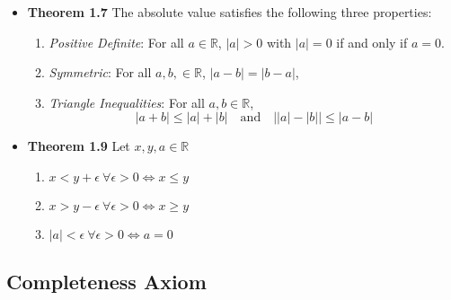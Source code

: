 \documentclass[11pt,a4paper]{article}
\begin{document}
\begin{itemize}
    \item \textbf{Theorem 1.7} The absolute value satisfies the following three properties:
        \begin{enumerate}
            \item \emph{Positive Definite}:
                For all $a \in \mathbb{R}$, $|a| > 0$ with $|a| = 0$ if and only if $a = 0$.
            \item \emph{Symmetric}:
                For all $a, b, \in \mathbb{R}$, $|a - b| = |b - a|$,
            \item \emph{Triangle Inequalities}:
                For all $a, b \in \mathbb{R}$,
                \[
                    |a + b| \leq |a| + |b| \quad \text{and}
                    \quad \lvert |a| - |b| \rvert \leq |a - b|
                \]
        \end{enumerate}

    \item \textbf{Theorem 1.9} Let $x, y, a \in \mathbb{R}$
        \begin{enumerate}
            \item $x < y + \epsilon \ \forall \epsilon > 0 \iff x \leq y$
            \item $x > y - \epsilon \ \forall \epsilon > 0 \iff x \geq y$
            \item $|a| < \epsilon \ \forall \epsilon > 0 \iff a = 0$
        \end{enumerate}

\end{itemize}

\subsection{Completeness Axiom}
\end{document}
